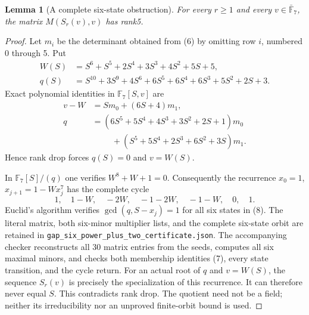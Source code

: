 \documentclass[11pt]{article}
\newtheorem{lemma}{Lemma}
\begin{document}
\begin{lemma}[A complete six-state obstruction]\label{lem:certificate}
For every $r\ge1$ and every $v\in\bar{\mathbb F}_7$,
the matrix $M(S_r(v),v)$ has rank5.
\end{lemma}
\begin{proof}
Let $m_i$ be the determinant obtained from (6) by omitting row $i$,
numbered 0 through 5. Put
\[
 \begin{split}
 W(S)&=S^6+S^5+2S^4+3S^3+4S^2+5S+5,\\
 q(S)&=S^{10}+3S^9+4S^6+6S^5+6S^4+6S^3+5S^2+2S+3.
 \end{split}
\]
Exact polynomial identities in $\mathbb F_7[S,v]$ are
\[
 \begin{split}
 v-W&=S m_0+(6S+4)m_1,\\
 q&=(6S^5+5S^4+4S^3+3S^2+2S+1)m_0\\
   &\hspace{1cm}+(S^5+5S^4+2S^3+6S^2+3S)m_1.
 \end{split}                                                   \tag{7}
\]
Hence rank drop forces $q(S)=0$ and $v=W(S)$.

In $\mathbb F_7[S]/(q)$ one verifies $W^8+W+1=0$.
Consequently the recurrence $x_0=1$,
$x_{j+1}=1-Wx_j^7$ has the complete cycle
\[
 1,\quad1-W,\quad-2W,\quad-1-2W,\quad-1-W,\quad0,\quad1.          \tag{8}
\]
Euclid's algorithm verifies
$\gcd(q,S-x_j)=1$ for all six states in (8).
The literal matrix, both six-minor multiplier lists, and the complete
six-state orbit are retained in
\texttt{gap\_six\_power\_plus\_two\_}\allowbreak\texttt{certificate.json}.
The accompanying checker reconstructs all 30 matrix entries from
the seeds, computes all six maximal minors, and checks both
membership identities (7), every state transition, and the cycle return.
For an actual root of $q$ and $v=W(S)$, the sequence $S_r(v)$
is precisely the specialization of this recurrence.
It can therefore never equal $S$. This contradicts rank drop.
The quotient need not be a field; neither its irreducibility nor
an unproved finite-orbit bound is used.
\end{proof}
\end{document}
